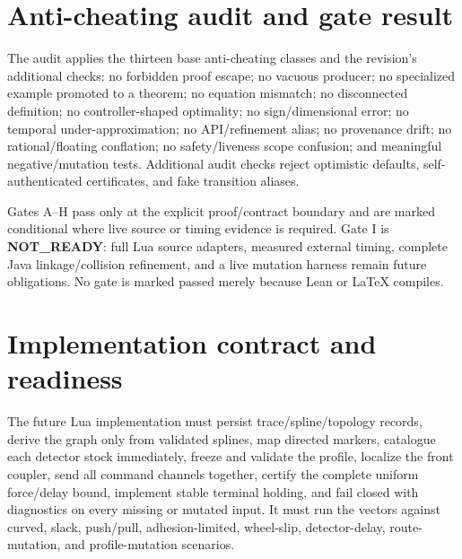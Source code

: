 \documentclass[10pt,a4paper]{article}
\begin{document}
\section{Anti-cheating audit and gate result}

The audit applies the thirteen base anti-cheating classes and the revision's
additional checks: no forbidden proof escape; no vacuous producer; no
specialized example promoted to a theorem; no equation mismatch; no
disconnected definition; no controller-shaped optimality; no sign/dimensional
error; no temporal under-approximation; no API/refinement alias; no
provenance drift; no rational/floating conflation; no safety/liveness scope
confusion; and meaningful negative/mutation tests. Additional audit checks
reject optimistic defaults, self-authenticated certificates, and fake
transition aliases.

Gates A--H pass only at the explicit proof/contract boundary and are marked
conditional where live source or timing evidence is required. Gate I is
\textbf{NOT\_READY}: full Lua source adapters, measured external timing,
complete Java linkage/collision refinement, and a live mutation harness remain
future obligations. No gate is marked passed merely because Lean or LaTeX
compiles.

\section{Implementation contract and readiness}

The future Lua implementation must persist trace/spline/topology records,
derive the graph only from validated splines, map directed markers, catalogue
each detector stock immediately, freeze and validate the profile, localize the
front coupler, send all command channels together, certify the complete
uniform force/delay bound, implement stable terminal holding, and fail closed
with diagnostics on every missing or mutated input. It must run the vectors
against curved, slack, push/pull, adhesion-limited, wheel-slip, detector-delay,
route-mutation, and profile-mutation scenarios.
\end{document}
